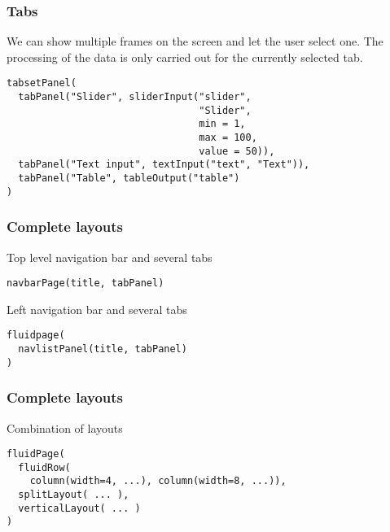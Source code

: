 \documentclass{beamer}
\begin{document}
	\begin{frame}[fragile]
		\frametitle{Tabs}

		We can show multiple frames on the screen and let the user select one. The processing of the data is only carried out for the currently selected tab.

		\vspace{1em}
		
		\begin{exampleblock}{}
		\begin{BVerbatim}
tabsetPanel(
  tabPanel("Slider", sliderInput("slider",
                                 "Slider",
                                 min = 1,
                                 max = 100,
                                 value = 50)),
  tabPanel("Text input", textInput("text", "Text")),
  tabPanel("Table", tableOutput("table")
)
		\end{BVerbatim}
		\end{exampleblock}{}

	\end{frame}

	\begin{frame}[fragile]
		\frametitle{Complete layouts}

		Top level navigation bar and several tabs
		\begin{exampleblock}{}
		\begin{BVerbatim}
navbarPage(title, tabPanel)
		\end{BVerbatim}
		\end{exampleblock}{}

		\vspace{2em}

		Left navigation bar and several tabs
		\begin{exampleblock}{}
		\begin{BVerbatim}
fluidpage(
  navlistPanel(title, tabPanel)
)
		\end{BVerbatim}
		\end{exampleblock}{}

	\end{frame}

	\begin{frame}[fragile]
		\frametitle{Complete layouts}

		Combination of layouts
		\begin{exampleblock}{}
		\begin{BVerbatim}
fluidPage(
  fluidRow(
    column(width=4, ...), column(width=8, ...)),
  splitLayout( ... ),
  verticalLayout( ... )
)
		\end{BVerbatim}
		\end{exampleblock}{}

	\end{frame}
\end{document}
